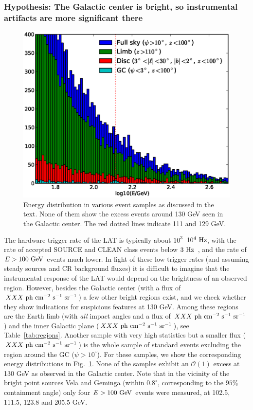 \documentclass[aps,twocolumn,prd,superscriptaddress,showpacs,nofootinbib,fixfloat]{revtex4}
\newcommand{\s}{{\rm ~s}}
\newcommand{\cm}{{\rm ~cm}}
\newcommand{\ph}{{\rm ~ph}}
\newcommand{\sr}{{\rm ~sr}}
\newcommand{\Hz}{{\rm ~Hz}}
\newcommand{\GeV}{{\rm ~GeV}}
\begin{document}
\subsubsection{Hypothesis: The Galactic center is bright, so
instrumental artifacts are more significant there}

\begin{figure}
  \centering
  \includegraphics[width=1.0\linewidth]{plots/target_spectra.eps}
  \caption{Energy distribution in various event samples 
      as
  discussed in the text. None of them show the excess events
  around 130 GeV seen in the Galactic center. The red dotted
  lines indicate 111 and 129 GeV.}
  \label{fig:target_spectra}
\end{figure}

The hardware trigger rate of the LAT is typically
about $10^3$--$10^4\Hz$, with the rate of
accepted SOURCE and CLEAN class events below
$3\Hz$~\citep{collaboration:2012kca}, and the rate of $E>100\GeV$ events
much lower. In light of these low trigger rates
(and assuming steady sources and CR background fluxes) it
is difficult to imagine that the instrumental response of the LAT
would depend on the brightness of an observed region.
However, besides the Galactic center (with a flux of $XXX
\ph\cm^{-2}\s^{-1}\sr^{-1}$) a few other bright regions
exist, and we check whether they show indications for
suspicious features at 130 GeV. Among these regions are the
Earth limb (with \emph{all} impact angles and a flux of $XXX
\ph \cm^{-2}\s^{-1}\sr^{-1}$) and the inner Galactic plane
($XXX\ph\cm^{-2}\s^{-1}\sr^{-1}$), see
Table~\ref{tab:regions}. Another sample with very high
statistics but a smaller flux (
$XXX\ph\cm^{-2}\s^{-1}\sr^{-1}$) is the whole sample of
standard events excluding the region around the GC
($\psi>10^\circ$).
For these samples, we show the corresponding energy
distributions in Fig.~\ref{fig:target_spectra}. None of the
samples exhibit an $\mathcal{O}(1)$ excess at 130 GeV as
observed in the Galactic center. Note that in the vicinity
of the bright point sources Vela and Geminga (within
$0.8^\circ$, corresponding to the $95\%$ containment angle) 
only four $E>100\GeV$ events were measured, at
102.5, 111.5, 123.8 and 205.5 GeV.
\medskip
\end{document}
